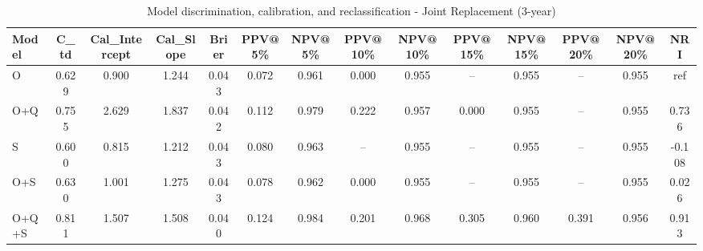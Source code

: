 \begin{table}[htbp]
\centering
\small
\caption{Model discrimination, calibration, and reclassification - Joint Replacement (3-year)}
\label{tab:perf_joint_3y}
\begin{tabular}{lccccccccccccc}
\toprule
Model & C\_td & Cal\_Intercept & Cal\_Slope & Brier & PPV@5\% & NPV@5\% & PPV@10\% & NPV@10\% & PPV@15\% & NPV@15\% & PPV@20\% & NPV@20\% & NRI \\
\midrule
O & 0.629 & 0.900 & 1.244 & 0.043 & 0.072 & 0.961 & 0.000 & 0.955 & -- & 0.955 & -- & 0.955 & ref \\
O+Q & 0.755 & 2.629 & 1.837 & 0.042 & 0.112 & 0.979 & 0.222 & 0.957 & 0.000 & 0.955 & -- & 0.955 & 0.736 \\
S & 0.600 & 0.815 & 1.212 & 0.043 & 0.080 & 0.963 & -- & 0.955 & -- & 0.955 & -- & 0.955 & -0.108 \\
O+S & 0.630 & 1.001 & 1.275 & 0.043 & 0.078 & 0.962 & 0.000 & 0.955 & -- & 0.955 & -- & 0.955 & 0.026 \\
O+Q+S & 0.811 & 1.507 & 1.508 & 0.040 & 0.124 & 0.984 & 0.201 & 0.968 & 0.305 & 0.960 & 0.391 & 0.956 & 0.913 \\
\bottomrule
\end{tabular}
\end{table}